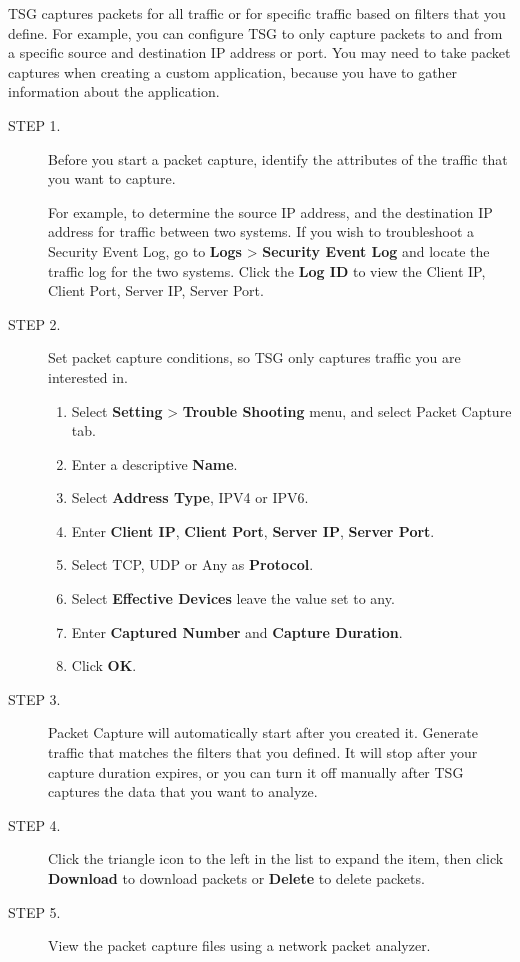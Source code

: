 TSG captures packets for all traffic or for specific traffic based on filters that you define. For example, you can configure TSG to only capture packets to and from a specific source and destination IP address or port. You may need to take packet captures when creating a custom application, because you have to gather information about the application.

\begin{description}
    \item[STEP 1.]	Before you start a packet capture, identify the attributes of the traffic that you want to capture.


    For example, to determine the source IP address, and the destination IP address for traffic between two systems. 
    If you wish to troubleshoot a Security Event Log, go to \textbf{Logs} > \textbf{Security Event Log} and locate the traffic log for the two systems. 
    Click the \textbf{Log ID} to view the Client IP, Client Port, Server IP, Server Port.
    \item[STEP 2.]	Set packet capture conditions, so TSG only captures traffic you are interested in.
    \begin{enumerate}
        \item Select \textbf{Setting} > \textbf{Trouble Shooting} menu, and select Packet Capture tab.
        \item Enter a descriptive \textbf{Name}.
        \item Select \textbf{Address Type}, IPV4 or IPV6.
        \item Enter \textbf{Client IP}, \textbf{Client Port}, \textbf{Server IP}, \textbf{Server Port}.
        \item Select TCP, UDP or Any as \textbf{Protocol}.
        \item Select \textbf{Effective Devices} leave the value set to any.
        \item Enter \textbf{Captured Number} and \textbf{Capture Duration}.
        \item Click \textbf{OK}.
    \end{enumerate} 
    \item[STEP 3.]	Packet Capture will automatically start after you created it. Generate traffic that matches the filters that you defined. It will stop after your capture duration expires, or you can turn it off manually after TSG captures the data that you want to analyze.
    \item[STEP 4.]	Click the triangle icon to the left in the list to expand the item, then click \textbf{Download} to download packets or \textbf{Delete} to delete packets.
    \item[STEP 5.]	View the packet capture files using a network packet analyzer.
\end{description}